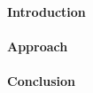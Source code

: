\lipsum[1]

\paragraph{Introduction}
\lipsum[1]

\paragraph{Approach}
\lipsum[1]

\paragraph{Conclusion}
\lipsum[1]
